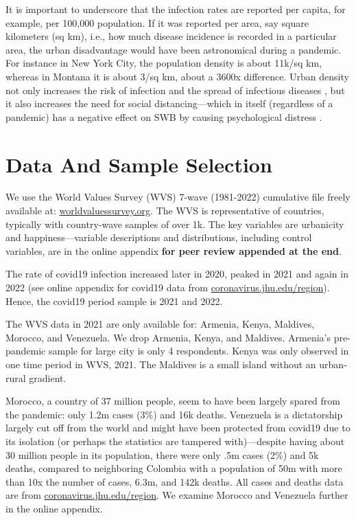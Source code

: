 \documentclass[10pt, letterpaper]{article}
\begin{document}
\begin{spacing}{1.4}
 It is important to underscore that the infection rates are reported per capita,
 for example, per 100,000 population. If it was reported per area, say square kilometers (sq km),
 i.e., how much disease incidence is recorded in a particular area, the urban
 disadvantage would have been astronomical during a pandemic. For instance in New
 York City, the population density is about 11k/sq km, whereas in Montana it is
 about 3/sq km, about a 3600x difference. 
 Urban density not only increases the risk of infection and the spread of infectious
diseases \citep{bettencourt10b}, but it also increases the need for social distancing---which in itself (regardless of a pandemic) has a negative effect on SWB by causing psychological distress \citep{khan2021quality}.


\section{Data And Sample Selection}

We use the World Values Survey (WVS) 7-wave (1981-2022) cumulative file freely
available at: \url{worldvaluessurvey.org}. The WVS is representative of countries,
typically with country-wave samples of over 1k. The key variables are urbanicity
and happiness---variable descriptions and distributions, including control
variables, are in the online appendix \textbf{for peer review appended at the end}. 

The rate of covid19 infection increased later in 2020, peaked in 2021 and again in 2022 (see online appendix for covid19 data from \url{coronavirus.jhu.edu/region}). Hence, the covid19 period sample is 2021 and 2022. %

The WVS data in 2021 are only available for: Armenia, Kenya, Maldives, Morocco, and Venezuela. 
 We drop Armenia, Kenya, and Maldives. Armenia's pre-pandemic sample for large city is only 4 respondents.  Kenya %
  was only observed in one time period in WVS, 2021. The Maldives is a small island
  without an urban-rural gradient. 

  Morocco, a country of 37 million people, seem to have been largely spared from
  the pandemic: only 1.2m cases (3\%) and 16k deaths. Venezuela is a
  dictatorship largely cut off from the world and might have been protected from
  covid19 due to its isolation (or perhaps the statistics are tampered with)---despite having about 30 million people in its population, there were only .5m cases (2\%) and 5k deaths, compared to neighboring Colombia with a population of 50m with more than 10x the number of cases, 6.3m, and 142k deaths. All cases and deaths data are from  \url{coronavirus.jhu.edu/region}. We examine Morocco and Venezuela further in the online appendix.%


\end{spacing}
\end{document}
